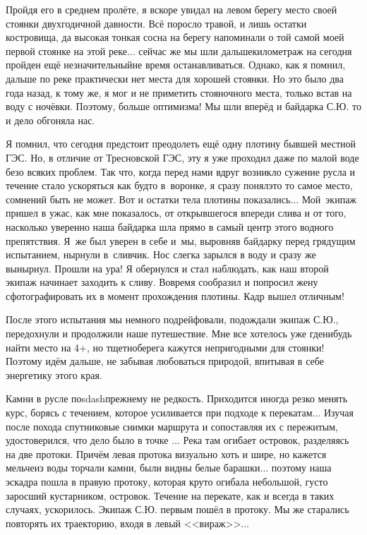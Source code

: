 Пройдя его в среднем пролёте, я вскоре увидал на левом берегу место своей стоянки двухгодичной давности. Всё поросло травой, и лишь остатки костровища, да высокая тонкая сосна на берегу напоминали о той самой моей первой стоянке на этой реке$\ldots$ сейчас же мы шли дальше\mdash километраж на сегодня пройден ещё незначительный\mdash  не время останавливаться. Однако, как я помнил, дальше по реке практически нет места для хорошей стоянки. Но это было два года назад, к тому же, я мог и не приметить стояночного места, только встав на воду с ночёвки. Поэтому, больше оптимизма! Мы шли вперёд и байдарка С.Ю. то и дело обгоняла нас. 

Я помнил, что сегодня предстоит преодолеть ещё одну плотину бывшей местной ГЭС. Но, в отличие от Тресновской ГЭС, эту я уже проходил даже по малой воде безо всяких проблем. Так что, когда перед нами вдруг возникло сужение русла и течение стало ускоряться как будто в~воронке, я сразу понял\mdash это то самое место, сомнений быть не может. Вот и остатки тела плотины показались$\ldots$ Мой~экипаж пришел в ужас, как мне показалось, от открывшегося впереди слива и от того, насколько уверенно наша байдарка шла прямо в самый центр этого водного препятствия. Я~же был уверен в себе и~мы, выровняв байдарку перед грядущим испытанием, нырнули в~сливчик. Нос слегка зарылся в воду и сразу же вынырнул. Прошли на ура! Я обернулся и стал наблюдать, как наш второй экипаж начинает заходить к сливу. Вовремя сообразил и попросил жену сфотографировать их в момент прохождения плотины. Кадр вышел отличным!

После этого испытания мы немного подрейфовали, подождали экипаж С.Ю., передохнули и продолжили наше путешествие. Мне все хотелось уже где\sdash нибудь найти место на 4+, но тщетно\mdash берега кажутся непригодными для стоянки! Поэтому идём дальше, не забывая любоваться природой, впитывая в себе энергетику этого края.

Камни в русле поsdashпрежнему не редкость. Приходится иногда резко менять курс, борясь с течением, которое усиливается при подходе к перекатам$\ldots$ Изучая после похода спутниковые снимки маршрута и сопоставляя их с пережитым, удостоверился, что дело было в точке \CoordsLidRightProtoka$\ldots$ Река там огибает островок, разделяясь на две протоки. Причём левая протока визуально хоть и шире, но кажется мельче\mdash из воды торчали камни, были видны белые барашки$\ldots$ поэтому наша эскадра пошла в правую протоку, которая круто огибала небольшой, густо заросший кустарником, островок. Течение на перекате, как и всегда в таких случаях, ускорилось. Экипаж С.Ю. первым пошёл в протоку. Мы же старались повторять их траекторию, входя в левый <<вираж>>$\ldots$ 

